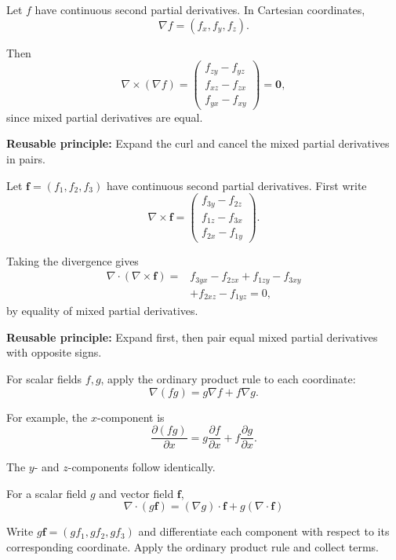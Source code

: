 \begin{method}
  Let $f$ have continuous second partial derivatives. In Cartesian coordinates,
  \[
  \nabla f=(f_x,f_y,f_z).
  \]

  Then
  \[
  \nabla\times(\nabla f)
  =
  \begin{pmatrix}
  f_{zy}-f_{yz}\\
  f_{xz}-f_{zx}\\
  f_{yx}-f_{xy}
  \end{pmatrix}
  =
  \boldsymbol{0},
  \]
  since mixed partial derivatives are equal.

  \textbf{Reusable principle:} Expand the curl and cancel the mixed partial derivatives in pairs.
\end{method}

\begin{method}
  Let $\boldsymbol{f}=(f_1,f_2,f_3)$ have continuous second partial derivatives. First write
  \[
  \nabla\times\boldsymbol{f}
  =
  \begin{pmatrix}
  f_{3y}-f_{2z}\\
  f_{1z}-f_{3x}\\
  f_{2x}-f_{1y}
  \end{pmatrix}.
  \]

  Taking the divergence gives
  \[
  \begin{aligned}
  \nabla\cdot(\nabla\times\boldsymbol{f})
  ={}&f_{3yx}-f_{2zx}
  +f_{1zy}-f_{3xy}\\
  &+f_{2xz}-f_{1yz}=0,
  \end{aligned}
  \]
  by equality of mixed partial derivatives.

  \textbf{Reusable principle:} Expand first, then pair equal mixed partial derivatives with opposite signs.
\end{method}

\begin{method}
  For scalar fields $f,g$, apply the ordinary product rule to each coordinate:
  \[
  \boxed{\nabla(fg)=g\nabla f+f\nabla g.}
  \]

  For example, the $x$-component is
  \[
  \frac{\partial(fg)}{\partial x}
  =g\frac{\partial f}{\partial x}
  +f\frac{\partial g}{\partial x}.
  \]

  The $y$- and $z$-components follow identically.
\end{method}

\begin{method}
  For a scalar field $g$ and vector field $\boldsymbol{f}$,
  \[
  \boxed{
  \nabla\cdot(g\boldsymbol{f})
  =(\nabla g)\cdot\boldsymbol{f}
  +g(\nabla\cdot\boldsymbol{f})
  }
  \]

  Write $g\boldsymbol{f}=(gf_1,gf_2,gf_3)$ and differentiate each component with respect to its corresponding coordinate. Apply the ordinary product rule and collect terms.
\end{method}

